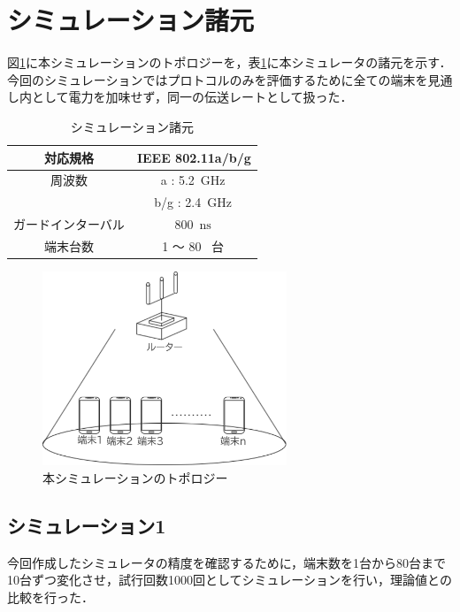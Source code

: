 \documentclass[a4paper,10pt]{ltjsarticle}
\begin{document}
\clearpage
\section{シミュレーション諸元}

図\ref{fig:topology}に本シミュレーションのトポロジーを，表\ref{tab:sim-base-param}に本シミュレータの諸元を示す．今回のシミュレーションではプロトコルのみを評価するために全ての端末を見通し内として電力を加味せず，同一の伝送レートとして扱った．

\begin{table}[H]
  \centering
  \caption{シミュレーション諸元}
  \label{tab:sim-base-param}
  \begin{tabular}{c|c}
    \hline
    対応規格 & IEEE 802.11a/b/g \\ 
    \hline
    周波数 & a : 5.2  \,$\mathrm{GHz}$\, \\
    & b/g : 2.4  \,$\mathrm{GHz}$\, \\
    \hline
    ガードインターバル & 800  \,$\mathrm{ns}$\, \\
    \hline
    端末台数 & 1 ～ 80 \, 台\, \\
    \hline
  \end{tabular}
\end{table}

\begin{figure}[H]
  \centering
  \includegraphics[width=0.65\textwidth]{./assets/topology.png}
  \caption{本シミュレーションのトポロジー}
  \label{fig:topology}
\end{figure}

\clearpage
\subsection{シミュレーション1}
今回作成したシミュレータの精度を確認するために，端末数を1台から80台まで10台ずつ変化させ，試行回数1000回としてシミュレーションを行い，理論値\cite{paper}との比較を行った．
\end{document}
